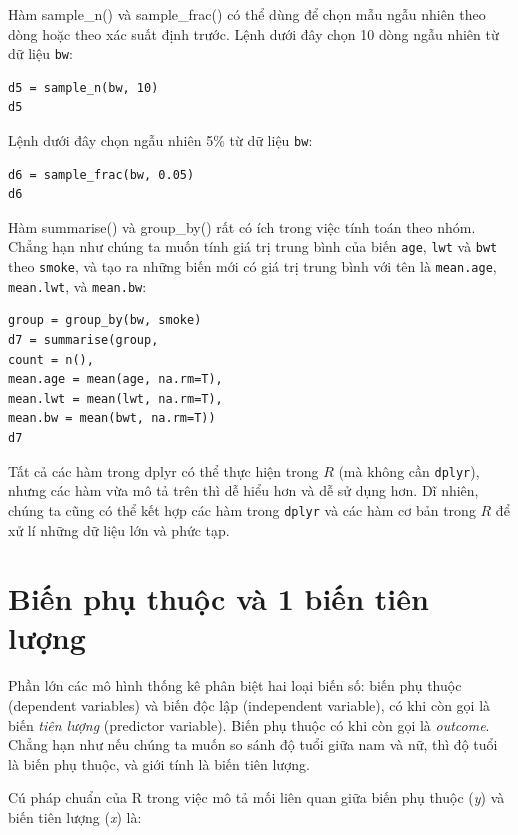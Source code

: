 \documentclass[
]{book}
\begin{document}
{Hàm sample\_n()} và {sample\_frac()} có thể dùng để chọn mẫu ngẫu nhiên theo dòng hoặc theo xác suất định trước. Lệnh dưới đây chọn 10 dòng ngẫu nhiên từ dữ liệu \texttt{bw}:

\begin{verbatim}
d5 = sample_n(bw, 10)
d5
\end{verbatim}

Lệnh dưới đây chọn ngẫu nhiên 5\% từ dữ liệu \texttt{bw}:

\begin{verbatim}
d6 = sample_frac(bw, 0.05)
d6
\end{verbatim}

{Hàm summarise()} và {group\_by()} rất có ích trong việc tính toán theo nhóm. Chẳng hạn như chúng ta muốn tính giá trị trung bình của biến \texttt{age}, \texttt{lwt} và \texttt{bwt} theo \texttt{smoke}, và tạo ra những biến mới có giá trị trung bình với tên là \texttt{mean.age}, \texttt{mean.lwt}, và \texttt{mean.bw}:

\begin{verbatim}
group = group_by(bw, smoke)
d7 = summarise(group, 
count = n(),
mean.age = mean(age, na.rm=T), 
mean.lwt = mean(lwt, na.rm=T),
mean.bw = mean(bwt, na.rm=T))
d7
\end{verbatim}

Tất cả các hàm trong dplyr có thể thực hiện trong \(R\) (mà không cần \texttt{dplyr}), nhưng các hàm vừa mô tả trên thì dễ hiểu hơn và dễ sử dụng hơn. Dĩ nhiên, chúng ta cũng có thể kết hợp các hàm trong \texttt{dplyr} và các hàm cơ bản trong \(R\) để xử lí những dữ liệu lớn và phức tạp.

\hypertarget{biux1ebfn-phux1ee5-thuux1ed9c-vuxe0-1-biux1ebfn-tiuxean-lux1b0ux1ee3ng}{%
\section{Biến phụ thuộc và 1 biến tiên lượng}\label{biux1ebfn-phux1ee5-thuux1ed9c-vuxe0-1-biux1ebfn-tiuxean-lux1b0ux1ee3ng}}

Phần lớn các mô hình thống kê phân biệt hai loại biến số: biến phụ thuộc (dependent variables) và biến độc lập (independent variable), có khi còn gọi là biến \emph{tiên lượng} (predictor variable). Biến phụ thuộc có khi còn gọi là \emph{outcome}. Chẳng hạn như nếu chúng ta muốn so sánh độ tuổi giữa nam và nữ, thì độ tuổi là biến phụ thuộc, và giới tính là biến tiên lượng.

Cú pháp chuẩn của R trong việc mô tả mối liên quan giữa biến phụ thuộc (\emph{y}) và biến tiên lượng (\emph{x}) là:
\end{document}
